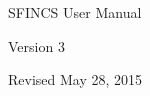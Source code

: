 \begin{center}

\vspace*{2in}

{\Huge SFINCS User Manual}

\vspace{4in}

{\Large Version 3}

\vspace{0.5in}

Revised May 28, 2015

\end{center}

